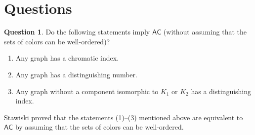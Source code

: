 \documentclass[12pt,reqno,a4paper]{amsart}
\theoremstyle{definition}
\newtheorem{question}[defn]{Question}
\begin{document}
	\section{Questions}
	\begin{question}
		Do the following statements imply $\mathsf{AC}$ (without assuming that the sets of colors can be well-ordered)?
		\begin{enumerate}
			\item Any graph has a chromatic index.
			\item Any graph has a distinguishing number.
			\item Any graph without a component isomorphic to $K_1$ or $K_2$ has a distinguishing index.
		\end{enumerate}
		Stawiski \cite[Theorem 3.8]{Sta2023} proved that the statements (1)--(3) mentioned above are equivalent to $\mathsf{AC}$ by assuming that the 
		sets of colors can be well-ordered.
	\end{question} 
	
\end{document}
